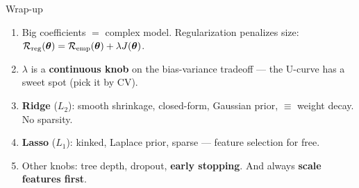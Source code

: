 \documentclass[aspectratio=169]{beamer}
\begin{document}
\begin{frame}{Wrap-up}
  \begin{enumerate}\small
    \item Big coefficients $=$ complex model. Regularization penalizes size: $\mathcal{R}_{\text{reg}}(\bm{\theta}) = \mathcal{R}_{\text{emp}}(\bm{\theta}) + \lambda J(\bm{\theta})$.
    \item $\lambda$ is a \textbf{continuous knob} on the bias-variance tradeoff --- the U-curve has a sweet spot (pick it by CV).
    \item \textbf{Ridge} ($L_2$): smooth shrinkage, closed-form, Gaussian prior, $\equiv$ weight decay. No sparsity.
    \item \textbf{Lasso} ($L_1$): kinked, Laplace prior, sparse --- feature selection for free.
    \item Other knobs: tree depth, dropout, \textbf{early stopping}. And always \textbf{scale features first}.
  \end{enumerate}
  \vfill
\end{frame}
\end{document}
